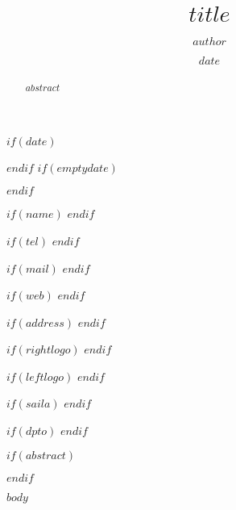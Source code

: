 \documentclass[$if(classoptions)$$classoptions$$endif$]{ifreport}
\begin{document}
\title{$title$}
\author{$author$}


$if(date)$
\date{$date$}
$endif$
$if(emptydate)$
\date{}
$endif$


$if(name)$
$endif$

$if(tel)$
$endif$

$if(mail)$
$endif$

$if(web)$
$endif$

$if(address)$
$endif$

$if(rightlogo)$
$endif$


$if(leftlogo)$
$endif$

$if(saila)$
$endif$

$if(dpto)$
$endif$

\maketitle
$if(abstract)$
\begin{abstract}
$abstract$
\end{abstract}
$endif$


$body$
\end{document}
